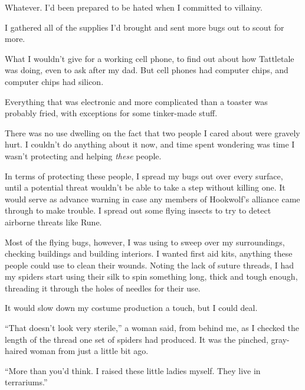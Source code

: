 Whatever.  I'd been prepared to be hated when I committed to villainy.



I gathered all of the supplies I'd brought and sent more bugs out to scout for more.



What I wouldn't give for a working cell phone, to find out about how Tattletale was doing, even to ask after my dad.  But cell phones had computer chips, and computer chips had silicon.



Everything that was electronic and more complicated than a toaster was probably fried, with exceptions for some tinker-made stuff.



There was no use dwelling on the fact that two people I cared about were gravely hurt.  I couldn't do anything about it now, and time spent wondering was time I wasn't protecting and helping \emph{these} people.



In terms of protecting these people, I spread my bugs out over every surface, until a potential threat wouldn't be able to take a step without killing one.  It would serve as advance warning in case any members of Hookwolf's alliance came through to make trouble.  I spread out some flying insects to try to detect airborne threats like Rune.



Most of the flying bugs, however, I was using to sweep over my surroundings, checking buildings and building interiors.  I wanted first aid kits, anything these people could use to clean their wounds.  Noting the lack of suture threads, I had my spiders start using their silk to spin something long, thick and tough enough, threading it through the holes of needles for their use.



It would slow down my costume production a touch, but I could deal.



``That doesn't look very sterile,'' a woman said, from behind me, as I checked the length of the thread one set of spiders had produced.  It was the pinched, gray-haired woman from just a little bit ago.



``More than you'd think.  I raised these little ladies myself.  They live in terrariums.''



